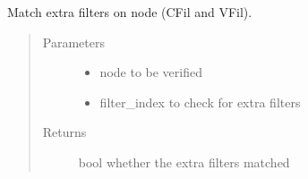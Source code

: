 \documentclass[a4paper,10pt,english]{sphinxmanual}
\begin{document}
\begin{fulllineitems}
\begin{fulllineitems}
\begin{quote}
\begin{description}
\begin{description}
\end{description}


\end{description}\end{quote}

\end{fulllineitems}


\begin{fulllineitems}
\label{\detokenize{fagus.filters:fagus.filters.KFil.match_extra_filters}}
\pysigstartsignatures
{}
\pysigstopsignatures
\sphinxAtStartPar
Match extra filters on node (CFil and VFil).
\begin{quote}\begin{description}
\item[{Parameters}] \leavevmode\begin{itemize}
\item {}
\sphinxAtStartPar
{} \textendash{} node to be verified

\item {}
\sphinxAtStartPar
{} \textendash{} filter\_index to check for extra filters

\end{itemize}

\item[{Returns}] \leavevmode
\sphinxAtStartPar
bool whether the extra filters matched

\end{description}\end{quote}

\end{fulllineitems}


\begin{fulllineitems}
\label{\detokenize{fagus.filters:fagus.filters.KFil.__module__}}
\pysigstartsignatures
{}
\pysigstopsignatures
\end{fulllineitems}


\end{fulllineitems}
\end{document}
